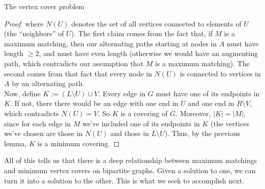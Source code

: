 \documentclass[11pt]{article}
\renewcommand{\'}{^{'}}
\begin{document}
\begin{section}{The vertex cover problem}
\begin{proof}
		where $N(U)$ denotes the set of all vertices connected to elements of $U$ (the 
		``neighbors'' of $U$). The first claim comes from the fact that, if $M$ is a 
		maximum matching, then our alternating paths starting at nodes in $A$ must have 
		length $\geq 2$, and must have even length (otherwise we would have an augmenting path, 
		which contradicts our assumption that $M$ is a maximum matching).
		The second comes from that fact that every node in $N(U)$ is connected to vertices in 
		$A$ by an alternating path. \\
		Now, define $K := (L\setminus U)\cup V$. Every edge 
		in $G$ must have one of its endpoints in $K$. If not, there there would be an 
		edge with one end in $U$ and one end in $R\setminus V$, which contradicts 
		$N(U) = V$. So $K$ is a covering of $G$. Moreover, $|K| = |M|$, since for each 
		edge in $M$ we've included one of its endpoints in $K$ (the vertices we've chosen are 
		those in $N(U)$ and those in $L\setminus U$). Thus, by the previous lemma, $K$ is 
		a minimum covering.
	\end{proof}

	All of this tells us that there is a deep relationship between maximum matchings and 
	minimum vertex covers on bipartite graphs. Given a solution to one, we can turn it into a 
	solution to the other. This is what we seek to accomplish next. 
\end{section}
\end{document}
